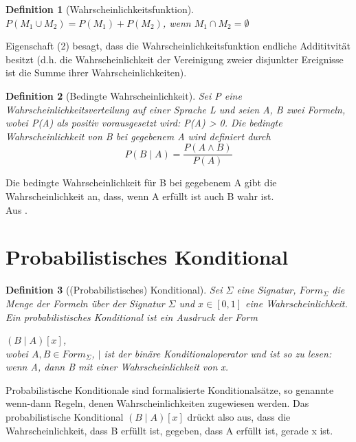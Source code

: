 \documentclass[a4paper, 11pt]{book}
\newtheorem{Def}{Definition }[section]
\begin{document}
{\begin{Def}[Wahrscheinlichkeitsfunktion]
$P(M_{1} \cup M_{2}) = P(M_{1}) + P(M_{2})$, wenn $M_{1} \cap M_{2} = \emptyset$
\end{Def}   
Eigenschaft (2) besagt, dass die Wahrscheinlichkeitsfunktion endliche Addititvität besitzt (d.h. die Wahrscheinlichkeit der Vereinigung zweier disjunkter Ereignisse ist die Summe ihrer Wahrscheinlichkeiten).\\

\begin{Def}[Bedingte Wahrscheinlichkeit] \label{sec: bed Wahr}
Sei P eine Wahrscheinlichkeitsverteilung auf einer Sprache L und seien A, B zwei Formeln, wobei P(A) als positiv vorausgesetzt wird: P(A) > 0. Die bedingte Wahrscheinlichkeit von B bei gegebenem A wird definiert durch\\
\[P( B\mid A ) = \frac{P(A\wedge B)}{P(A)}\]

\end{Def}
Die bedingte Wahrscheinlichkeit für B bei gegebenem A gibt die Wahrscheinlichkeit an, dass, wenn A erfüllt ist auch B wahr ist.\\
Aus \cite{BKI08}.
\newpage

\section{Probabilistisches Konditional}
\label{probKond}
\begin{Def}[(Probabilistisches) Konditional] 
Sei $ \Sigma $ eine Signatur, $ Form_{\Sigma} $ die Menge der Formeln über der Signatur $ \Sigma $ und $ x \in [0, 1] $ eine Wahrscheinlichkeit.
Ein probabilistisches Konditional ist ein Ausdruck der Form

\hspace{3 cm} $ (B \mid A)[x] $, \\
wobei $ A, B \in Form_\Sigma $, $ \mid $ ist der binäre Konditionaloperator und ist so zu lesen: wenn A, dann B mit einer Wahrscheinlichkeit von x. 
\end{Def}
Probabilistische Konditionale sind formalisierte Konditionalsätze, so genannte wenn-dann Regeln, denen Wahrscheinlichkeiten zugewiesen werden.
Das probabilistische Konditional $ (B \mid A)[x] $ drückt also aus, dass die Wahrscheinlichkeit, dass B erfüllt ist, gegeben, dass A erfüllt ist, gerade x ist.




}
\end{document}
